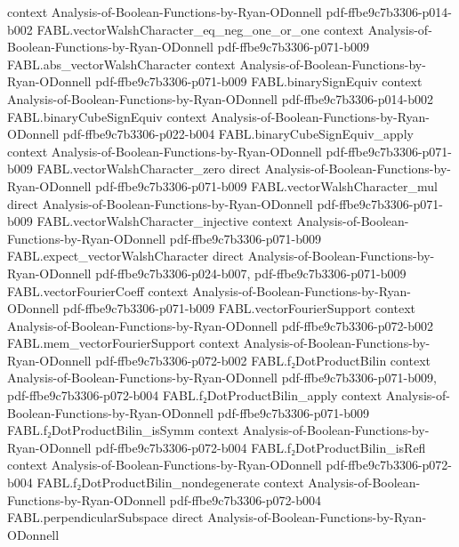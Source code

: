 \begin{theorem}
  {context}
  {Analysis-of-Boolean-Functions-by-Ryan-ODonnell}
  {pdf-ffbe9c7b3306-p014-b002}
\proofstep
  {FABL.vectorWalshCharacter_eq_neg_one_or_one}
  {context}
  {Analysis-of-Boolean-Functions-by-Ryan-ODonnell}
  {pdf-ffbe9c7b3306-p071-b009}
\proofstep
  {FABL.abs_vectorWalshCharacter}
  {context}
  {Analysis-of-Boolean-Functions-by-Ryan-ODonnell}
  {pdf-ffbe9c7b3306-p071-b009}
\proofstep
  {FABL.binarySignEquiv}
  {context}
  {Analysis-of-Boolean-Functions-by-Ryan-ODonnell}
  {pdf-ffbe9c7b3306-p014-b002}
\proofstep
  {FABL.binaryCubeSignEquiv}
  {context}
  {Analysis-of-Boolean-Functions-by-Ryan-ODonnell}
  {pdf-ffbe9c7b3306-p022-b004}
\proofstep
  {FABL.binaryCubeSignEquiv_apply}
  {context}
  {Analysis-of-Boolean-Functions-by-Ryan-ODonnell}
  {pdf-ffbe9c7b3306-p071-b009}
\proofstep
  {FABL.vectorWalshCharacter_zero}
  {direct}
  {Analysis-of-Boolean-Functions-by-Ryan-ODonnell}
  {pdf-ffbe9c7b3306-p071-b009}
\proofstep
  {FABL.vectorWalshCharacter_mul}
  {direct}
  {Analysis-of-Boolean-Functions-by-Ryan-ODonnell}
  {pdf-ffbe9c7b3306-p071-b009}
\proofstep
  {FABL.vectorWalshCharacter_injective}
  {context}
  {Analysis-of-Boolean-Functions-by-Ryan-ODonnell}
  {pdf-ffbe9c7b3306-p071-b009}
\proofstep
  {FABL.expect_vectorWalshCharacter}
  {direct}
  {Analysis-of-Boolean-Functions-by-Ryan-ODonnell}
  {pdf-ffbe9c7b3306-p024-b007,
    pdf-ffbe9c7b3306-p071-b009}
\proofstep
  {FABL.vectorFourierCoeff}
  {context}
  {Analysis-of-Boolean-Functions-by-Ryan-ODonnell}
  {pdf-ffbe9c7b3306-p071-b009}
\proofstep
  {FABL.vectorFourierSupport}
  {context}
  {Analysis-of-Boolean-Functions-by-Ryan-ODonnell}
  {pdf-ffbe9c7b3306-p072-b002}
\proofstep
  {FABL.mem_vectorFourierSupport}
  {context}
  {Analysis-of-Boolean-Functions-by-Ryan-ODonnell}
  {pdf-ffbe9c7b3306-p072-b002}
\proofstep
  {FABL.f₂DotProductBilin}
  {context}
  {Analysis-of-Boolean-Functions-by-Ryan-ODonnell}
  {pdf-ffbe9c7b3306-p071-b009,
    pdf-ffbe9c7b3306-p072-b004}
\proofstep
  {FABL.f₂DotProductBilin_apply}
  {context}
  {Analysis-of-Boolean-Functions-by-Ryan-ODonnell}
  {pdf-ffbe9c7b3306-p071-b009}
\proofstep
  {FABL.f₂DotProductBilin_isSymm}
  {context}
  {Analysis-of-Boolean-Functions-by-Ryan-ODonnell}
  {pdf-ffbe9c7b3306-p072-b004}
\proofstep
  {FABL.f₂DotProductBilin_isRefl}
  {context}
  {Analysis-of-Boolean-Functions-by-Ryan-ODonnell}
  {pdf-ffbe9c7b3306-p072-b004}
\proofstep
  {FABL.f₂DotProductBilin_nondegenerate}
  {context}
  {Analysis-of-Boolean-Functions-by-Ryan-ODonnell}
  {pdf-ffbe9c7b3306-p072-b004}
\proofstep
  {FABL.perpendicularSubspace}
  {direct}
  {Analysis-of-Boolean-Functions-by-Ryan-ODonnell}

\end{theorem}
